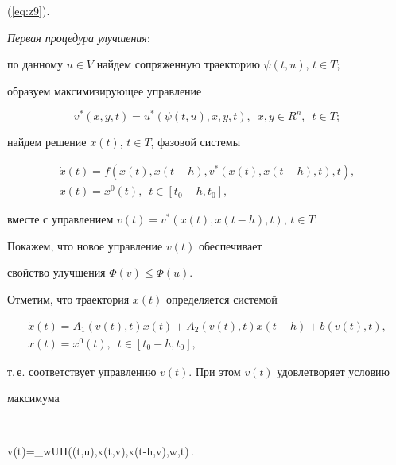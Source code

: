 (\ref{eq:z9}).





{\it Первая процедура улучшения}:





по данному $u\in V$ найдем сопряженную траекторию $\psi(t,u)$, $t\in T$;





образуем максимизирующее управление


$$


v^*(x,y,t)=u^*(\psi(t,u),x,y,t),\ \;x,y\in R^n,\ \;t\in T;


$$





найдем решение $x(t)$, $t\in T$, фазовой системы


\begin{gather*}


\Dot{x}(t) = f(x(t),x(t-h),v^*(x(t),x(t-h),t),t), \\


x(t)=x^0(t),\ \;t\in [t_0-h,t_0],




\end{gather*}


вместе с управлением $v(t)=v^*(x(t),x(t-h),t)$, $t\in T$.





Покажем, что новое управление $v(t)$ обеспечивает


свойство улучшения $\Phi(v)\leq\Phi(u)$.


Отметим, что траектория $x(t)$ определяется системой


\begin{gather*}


\Dot{x}(t) = A_1(v(t),t)x(t) + A_2(v(t),t)x(t-h) + b(v(t),t), \\


%


x(t)=x^0(t),\ \;t\in [t_0-h,t_0],


\end{gather*}


т.\,е. соответствует управлению $v(t)$. При этом $v(t)$ удовлетворяет условию


максимума


$$


v(t)=\argmax_{w\in U}H(\psi(t,u),x(t,v),x(t-h,v),w,t)\,.



